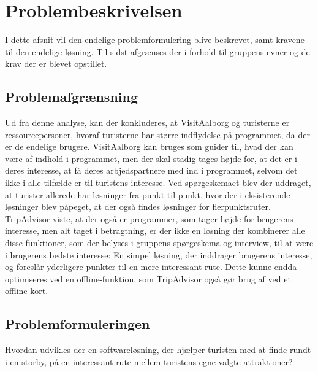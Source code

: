 \chapter{Problembeskrivelsen}

I dette afsnit vil den endelige problemformulering blive beskrevet, samt kravene til den endelige løsning. Til sidst afgrænses der i forhold til gruppens evner og de krav der er blevet opstillet. 

\section{Problemafgrænsning}
Ud fra denne analyse, kan der konkluderes, at VisitAalborg og turisterne er ressourcepersoner, hvoraf turisterne har større indflydelse på programmet, da der er de endelige brugere. VisitAalborg kan bruges som guider til, hvad der kan være af indhold i programmet, men der skal stadig tages højde for, at det er i deres interesse, at få deres arbjedspartnere med ind i programmet, selvom det ikke i alle tilfælde er til turistens interesse.
Ved spørgeskemaet blev der uddraget, at turister allerede har løsninger fra punkt til punkt, hvor der i eksisterende løsninger blev påpeget, at der også findes løsninger for flerpunktsruter. TripAdvisor viste, at der også er programmer, som tager højde for brugerens interesse, men alt taget i betragtning, er der ikke en løsning der kombinerer alle disse funktioner, som der belyses i gruppens spørgeskema og interview, til at være i brugerens bedste interesse: En simpel løsning, der inddrager brugerens interesse, og foreslår yderligere punkter til en mere interessant rute. Dette kunne endda optimiseres ved en offline-funktion, som TripAdvisor også gør brug af ved et offline kort.

\section{Problemformuleringen}
Hvordan udvikles der en softwareløsning, der hjælper turisten med at finde rundt i en storby, på en interessant rute mellem turistens egne valgte attraktioner?
